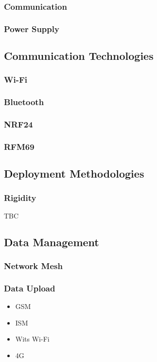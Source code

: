 \documentclass[10pt,twocolumn]{witseiepaper}
\begin{document}
		\subsubsection{Communication}
		\subsubsection{Power Supply}
	
	\subsection{Communication Technologies}
		\subsubsection{Wi-Fi}
		\subsubsection{Bluetooth}
		\subsubsection{NRF24}
		\subsubsection{RFM69}
	
	\subsection{Deployment Methodologies}
		\subsubsection{Rigidity}
		TBC
	
	\subsection{Data Management}
		\subsubsection{Network Mesh}
		\subsubsection{Data Upload}
			\begin{itemize}
				\item GSM
				\item ISM
				\item Wits Wi-Fi
				\item 4G
			\end{itemize}
\end{document}
